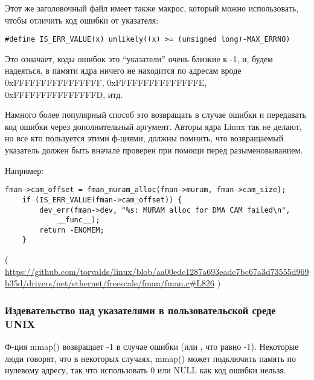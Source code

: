 Этот же заголовочный файл имеет также макрос, который можно использовать, чтобы отличить код ошибки от указателя:

\begin{lstlisting}[style=customc]
#define IS_ERR_VALUE(x) unlikely((x) >= (unsigned long)-MAX_ERRNO)
\end{lstlisting}

Это означает, коды ошибок это ``указатели'' очень близкие к -1, и, будем надеяться, в памяти ядра ничего не находится
по адресам вроде 0xFFFFFFFFFFFFFFFF, 0xFFFFFFFFFFFFFFFE, 0xFFFFFFFFFFFFFFFD, итд.

Намного более популярный способ это возвращать  в случае ошибки и передавать код ошибки через дополнительный
аргумент.
Авторы ядра Linux так не делают, но все кто пользуется этими ф-циями, должны помнить, что возвращаемый указатель
должен быть вначале проверен при помощи  перед разыменовыванием.

Например:

\begin{lstlisting}[style=customc]
	fman->cam_offset = fman_muram_alloc(fman->muram, fman->cam_size);
	if (IS_ERR_VALUE(fman->cam_offset)) {
		dev_err(fman->dev, "%s: MURAM alloc for DMA CAM failed\n",
			__func__);
		return -ENOMEM;
	}
\end{lstlisting}

( \url{https://github.com/torvalds/linux/blob/aa00edc1287a693eadc7bc67a3d73555d969b35d/drivers/net/ethernet/freescale/fman/fman.c#L826} )

\subsubsection{Издевательство над указателями в пользовательской среде UNIX}

Ф-ция mmap() возвращает -1 в случае ошибки (или , что равно -1).
Некоторые люди говорят, что в некоторых случаях, mmap() может подключить память по нулевому адресу, так что использовать
0 или NULL как код ошибки нельзя.

